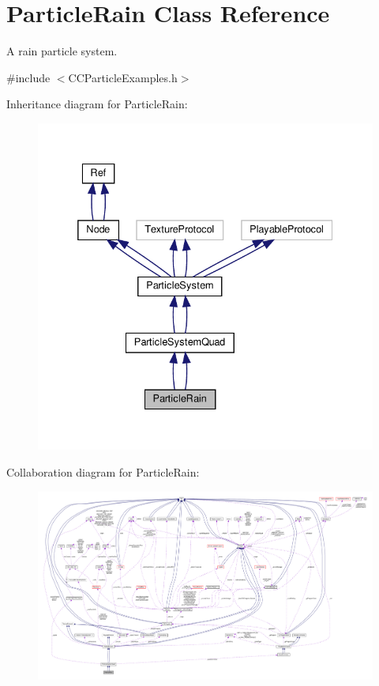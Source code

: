 \hypertarget{classParticleRain}{}\section{Particle\+Rain Class Reference}
\label{classParticleRain}


A rain particle system.  




{\ttfamily \#include $<$C\+C\+Particle\+Examples.\+h$>$}



Inheritance diagram for Particle\+Rain\+:
\nopagebreak
\begin{figure}[H]
\begin{center}
\leavevmode
\includegraphics[width=332pt]{classParticleRain__inherit__graph}
\end{center}
\end{figure}


Collaboration diagram for Particle\+Rain\+:
\nopagebreak
\begin{figure}[H]
\begin{center}
\leavevmode
\includegraphics[width=350pt]{classParticleRain__coll__graph}
\end{center}
\end{figure}
